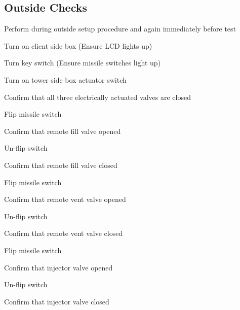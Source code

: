 \subsection{Outside Checks}
Perform during outside setup procedure and again immediately before test
\begin{checklist}
    \item Turn on client side box (Ensure LCD lights up)
    \item Turn key switch (Ensure missile switches light up)
    \item Turn on tower side box actuator switch
    \item Confirm that all three electrically actuated valves are closed
    \item Flip \rfill{} missile switch
    \begin{checklist}
        \item Confirm that remote fill valve opened
    \end{checklist}
    \item Un-flip \rfill{} switch
    \begin{checklist}
        \item Confirm that remote fill valve closed
    \end{checklist}

    \item Flip \rvent{} missile switch
    \begin{checklist}
        \item Confirm that remote vent valve opened
    \end{checklist}
    \item Un-flip \rvent{} switch
    \begin{checklist}
        \item Confirm that remote vent valve closed
    \end{checklist}

    \item Flip \inj{} missile switch
    \begin{checklist}
        \item Confirm that injector valve opened
    \end{checklist}
    \item Un-flip \inj{} switch
    \begin{checklist}
        \item Confirm that injector valve closed
    \end{checklist}
\end{checklist}
